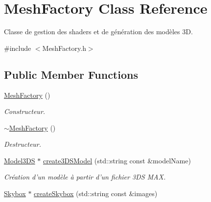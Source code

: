 \hypertarget{classMeshFactory}{\section{Mesh\-Factory Class Reference}
\label{classMeshFactory}
}


Classe de gestion des shaders et de génération des modèles 3\-D.  




{\ttfamily \#include $<$Mesh\-Factory.\-h$>$}

\subsection*{Public Member Functions}
\begin{DoxyCompactItemize}
\item 
\hypertarget{classMeshFactory_a4e7e1572a5d2ce108b5e2c53b58499d2}{\hyperlink{classMeshFactory_a4e7e1572a5d2ce108b5e2c53b58499d2}{Mesh\-Factory} ()}\label{classMeshFactory_a4e7e1572a5d2ce108b5e2c53b58499d2}

\begin{DoxyCompactList}\small\item\em Constructeur. \end{DoxyCompactList}\item 
\hypertarget{classMeshFactory_a642f0dc431ea97f93d3e1cea6df64b8e}{\hyperlink{classMeshFactory_a642f0dc431ea97f93d3e1cea6df64b8e}{$\sim$\-Mesh\-Factory} ()}\label{classMeshFactory_a642f0dc431ea97f93d3e1cea6df64b8e}

\begin{DoxyCompactList}\small\item\em Destructeur. \end{DoxyCompactList}\item 
\hypertarget{classMeshFactory_aed116b3fd378392baa10bae536a83ed4}{\hyperlink{classModel3DS}{Model3\-D\-S} $\ast$ \hyperlink{classMeshFactory_aed116b3fd378392baa10bae536a83ed4}{create3\-D\-S\-Model} (std\-::string const \&model\-Name)}\label{classMeshFactory_aed116b3fd378392baa10bae536a83ed4}

\begin{DoxyCompactList}\small\item\em Création d'un modèle à partir d'un fichier 3\-D\-S M\-A\-X. \end{DoxyCompactList}\item 
\hypertarget{classMeshFactory_a5e35b9f6089ea14c6c9ad88a8ba6f66e}{\hyperlink{classSkybox}{Skybox} $\ast$ \hyperlink{classMeshFactory_a5e35b9f6089ea14c6c9ad88a8ba6f66e}{create\-Skybox} (std\-::string const \&images)}\label{classMeshFactory_a5e35b9f6089ea14c6c9ad88a8ba6f66e}


\end{DoxyCompactItemize}
